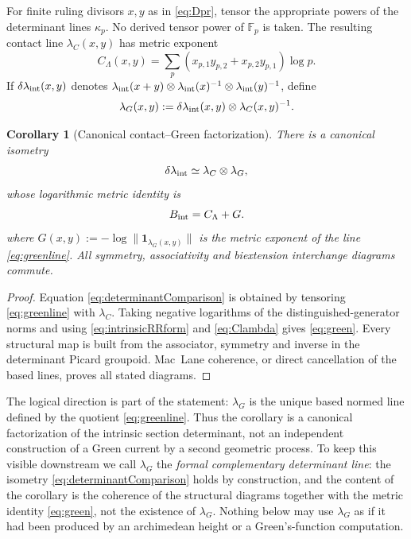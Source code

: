 \documentclass[11pt]{amsart}
\newtheorem{corollary}[theorem]{Corollary}
\theoremstyle{definition}
\theoremstyle{remark}
\begin{document}
For finite ruling divisors $x,y$ as in \eqref{eq:Dpr}, tensor the appropriate
powers of the determinant lines $\kappa_p$.  No derived tensor power of
$\mathbb F_p$ is taken.  The resulting contact line
$\lambda_C(x,y)$ has metric exponent
\begin{equation}\label{eq:Clambda}
 C_\Lambda(x,y)=\sum_p
 (x_{p,1}y_{p,2}+x_{p,2}y_{p,1})\log p.
\end{equation}
If $\delta\lambda_{\rm int}(x,y)$ denotes
$\lambda_{\rm int}(x+y)\otimes
\lambda_{\rm int}(x)^{-1}\otimes
\lambda_{\rm int}(y)^{-1}$, define
\begin{equation}\label{eq:greenline}
 \lambda_G(x,y):=\delta\lambda_{\rm int}(x,y)
                  \otimes\lambda_C(x,y)^{-1}.
\end{equation}

\begin{corollary}[Canonical contact--Green factorization]
\label{cor:determinantcomparison}
There is a canonical isometry
\begin{equation}\label{eq:determinantComparison}
 \delta\lambda_{\rm int}
 \simeq\lambda_C\otimes\lambda_G,
\end{equation}
whose logarithmic metric identity is
\begin{equation}\label{eq:green}
 B_{\rm int}=C_\Lambda+G.
\end{equation}
where $G(x,y):=-\log\|\mathbf 1_{\lambda_G(x,y)}\|$ is the metric exponent
of the line \eqref{eq:greenline}.
All symmetry, associativity and biextension interchange diagrams commute.
\end{corollary}

\begin{proof}
Equation \eqref{eq:determinantComparison} is obtained by tensoring
\eqref{eq:greenline} with $\lambda_C$.  Taking negative logarithms of the
distinguished-generator norms and using \eqref{eq:intrinsicRRform} and
\eqref{eq:Clambda} gives \eqref{eq:green}.  Every structural map is built
from the associator, symmetry and inverse in the determinant Picard
groupoid.  Mac~Lane coherence, or direct cancellation of the based lines,
proves all stated diagrams.
\end{proof}

The logical direction is part of the statement: $\lambda_G$ is the unique
based normed line defined by the quotient \eqref{eq:greenline}.  Thus the
corollary is a canonical factorization of the intrinsic section determinant,
not an independent construction of a Green current by a second geometric
process.  To keep this visible downstream we call $\lambda_G$ the
\emph{formal complementary determinant line}: the isometry
\eqref{eq:determinantComparison} holds by construction, and the content of
the corollary is the coherence of the structural diagrams together with the
metric identity \eqref{eq:green}, not the existence of $\lambda_G$.  Nothing
below may use $\lambda_G$ as if it had been produced by an archimedean
height or a Green's-function computation.
\end{document}
